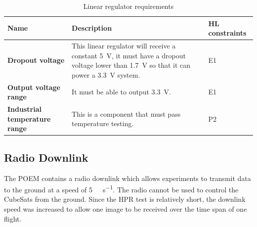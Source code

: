 \documentclass{report}
\begin{document}
\begin{table}[H]
  \centering
  \begin{tabular}{|L{0.2\textwidth}|L{0.495\textwidth}|L{0.2\textwidth}|}
    \hline
    \textbf{Name}                         & \textbf{Description}                                                                                                                                                  & \textbf{HL constraints} \\ \hline
    \textbf{Dropout voltage}              & This linear regulator will receive a constant \SI{5}{\volt}, it must have a dropout voltage lower than \SI{1.7}{\volt} so that it can power a \SI{3.3}{\volt} system. & E1                      \\\hline
    \textbf{Output voltage range}         & It must be able to output \SI{3.3}{\volt}.                                                                                                                            & E1                      \\\hline
    \textbf{Industrial temperature range} & This is a component that must pass temperature testing.                                                                                                               & P2                      \\\hline
  \end{tabular}
  \caption{Linear regulator requirements}
  \label{tabl:ldo-requirements}
\end{table}


\subsection{Radio Downlink}

The POEM contains a radio downlink which allows experiments to transmit data to the ground at a speed of \SI{5}{\kilo\bit\per\second}. The radio cannot be used to control the CubeSats from the ground. Since the HPR test is relatively short, the downlink speed was increased to allow one image to be received over the time span of one flight.
\end{document}
